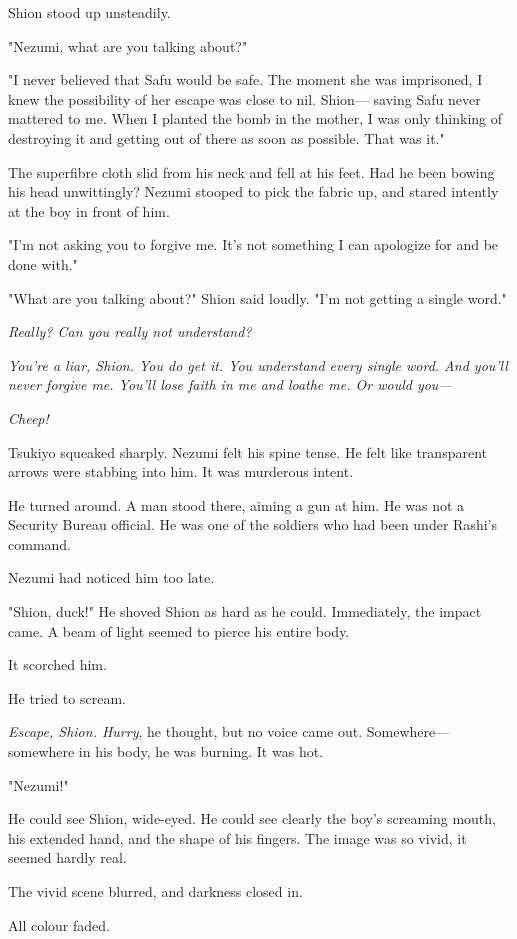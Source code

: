 Shion stood up unsteadily.

"Nezumi, what are you talking about?"

"I never believed that Safu would be safe. The moment she was
imprisoned, I knew the possibility of her escape was close to nil.
Shion--- saving Safu never mattered to me. When I planted the bomb in the
mother, I was only thinking of destroying it and getting out of there as
soon as possible. That was it."

The superfibre cloth slid from his neck and fell at his feet. Had he
been bowing his head unwittingly? Nezumi stooped to pick the fabric up,
and stared intently at the boy in front of him.

"I'm not asking you to forgive me. It's not something I can apologize
for and be done with."

"What are you talking about?" Shion said loudly. "I'm not getting a
single word."

\emph{Really? Can you really not understand?}

\emph{You're a liar, Shion. You do get it. You understand every single word.
And you'll never forgive me. You'll lose faith in me and loathe me. Or
would you---}

\emph{Cheep!}

Tsukiyo squeaked sharply. Nezumi felt his spine tense. He felt like
transparent arrows were stabbing into him. It was murderous intent.

He turned around. A man stood there, aiming a gun at him. He was not a
Security Bureau official. He was one of the soldiers who had been under
Rashi's command.

Nezumi had noticed him too late.

"Shion, duck!" He shoved Shion as hard as he could. Immediately, the
impact came. A beam of light seemed to pierce his entire body.

It scorched him.

He tried to scream.

\emph{Escape, Shion. Hurry}, he thought, but no voice came out. Somewhere---
somewhere in his body, he was burning. It was hot.

"Nezumi!"

He could see Shion, wide-eyed. He could see clearly the boy's screaming
mouth, his extended hand, and the shape of his fingers. The image was so
vivid, it seemed hardly real.

The vivid scene blurred, and darkness closed in.

All colour faded.

